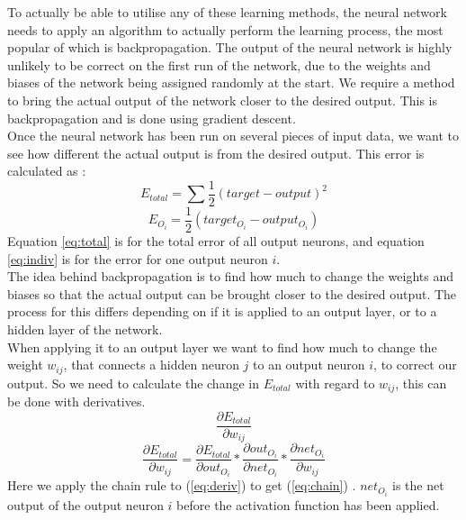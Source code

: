 \documentclass[10pt]{article}
\begin{document}
		 To actually be able to utilise any of these learning methods, the neural network needs to apply an algorithm to actually perform the learning process, the most popular of which is backpropagation. The output of the neural network is highly unlikely to be correct on the first run of the network, due to the weights and biases of the network being assigned randomly at the start. We require a method to bring the actual output of the network closer to the desired output. This is backpropagation and is done using gradient descent.\\
		 Once the neural network has been run on several pieces of input data, we want to see how different the actual output is from the desired output. This error is calculated as \cite{bpexample}:
		\begin{equation}\label{eq:total}
			E_{total} = \sum \frac{1}{2}(target-output)^2
		\end{equation}
		\begin{equation}\label{eq:indiv}
			E_{O_i} = \frac{1}{2}(target_{O_i} - output_{O_i})
		\end{equation}
		Equation \ref{eq:total} is for the total error of all output neurons, and equation \ref{eq:indiv} is for the error for one output neuron $i$.\\
				
		The idea behind backpropagation is to find how much to change the weights and biases so that the actual output can be brought closer to the desired output. The process for this differs depending on if it is applied to an output layer, or to a hidden layer of the network.\\
				
		When applying it to an output layer we want to find how much to change the weight $w_{ij}$, that connects a hidden neuron $j$ to an output neuron $i$, to correct our output. So we need to calculate the change in $E_{total}$ with regard to $w_{ij}$, this can be done with derivatives.
		\begin{equation}\label{eq:deriv}
			\frac{\partial E_{total}}{\partial w_{ij}}
		\end{equation}
		\begin{equation}\label{eq:chain}
			\frac{\partial E_{total}}{\partial w_{ij}} = \frac{\partial E_{total}}{\partial out_{O_i}} * \frac{\partial out_{O_i}}{\partial net_{O_i}} * \frac{\partial net_{O_i}}{\partial w_{ij}}
		\end{equation}
		Here we apply the chain rule to (\ref{eq:deriv}) to get (\ref{eq:chain}) \cite{bpexample}. $net_{O_i}$ is the net output of the output neuron $i$ before the activation function has been applied.\\
		
\end{document}
